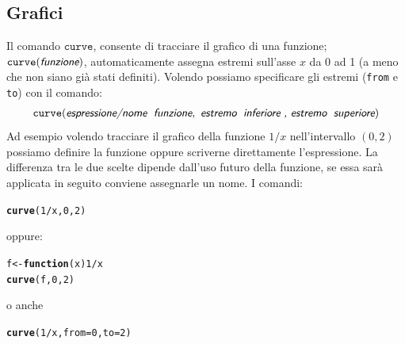 \documentclass[onecolumn,11pt]{book}\usepackage[]{graphicx}\usepackage[]{color}
\makeatletter
\newcommand{\hlnum}[1]{\textcolor[rgb]{0.686,0.059,0.569}{#1}}%
\newcommand{\hlopt}[1]{\textcolor[rgb]{0,0,0}{#1}}%
\newcommand{\hlstd}[1]{\textcolor[rgb]{0.345,0.345,0.345}{#1}}%
\newcommand{\hlkwa}[1]{\textcolor[rgb]{0.161,0.373,0.58}{\textbf{#1}}}%
\newcommand{\hlkwb}[1]{\textcolor[rgb]{0.69,0.353,0.396}{#1}}%
\newcommand{\hlkwc}[1]{\textcolor[rgb]{0.333,0.667,0.333}{#1}}%
\newcommand{\hlkwd}[1]{\textcolor[rgb]{0.737,0.353,0.396}{\textbf{#1}}}%
\newenvironment{kframe}{%
 \def\at@end@of@kframe{}%
 \ifinner\ifhmode%
  \def\at@end@of@kframe{\end{minipage}}%
  \begin{minipage}{\columnwidth}%
 \fi\fi%
 \def\FrameCommand##1{\hskip\@totalleftmargin \hskip-\fboxsep
 \colorbox{shadecolor}{##1}\hskip-\fboxsep
     \hskip-\linewidth \hskip-\@totalleftmargin \hskip\columnwidth}%
 \MakeFramed {\advance\hsize-\width
   \@totalleftmargin\z@ \linewidth\hsize
   \@setminipage}}%
 {\par\unskip\endMakeFramed%
 \at@end@of@kframe}
\newenvironment{knitrout}{}{} %
\newcommand{\varia}[1]{\textsl{\textsf{#1}}}
\makeatother
\begin{document}
\begin{itemize}
\subsection{Grafici}
Il comando $\texttt{curve}$, consente di tracciare il grafico di una funzione; $\texttt{curve}({\varia{funzione}})$, automaticamente assegna estremi sull'asse $x$ da 0 ad 1 (a meno che non siano gi\`a stati definiti). %
Volendo possiamo specificare gli estremi (\texttt{from} e \texttt{to}) con il comando: %
\begin{eqnarray*}\texttt{curve}(\varia{espressione/nome\; funzione}, \varia{ estremo\; inferiore , estremo \;superiore})\end{eqnarray*}
Ad esempio volendo tracciare il grafico della funzione $1/x$ nell'intervallo $(0,2)$ possiamo definire la funzione oppure scriverne direttamente l'espressione. %
La differenza tra le due scelte dipende dall'uso futuro della funzione, se essa sar\`a applicata in seguito conviene assegnarle un nome.
I comandi:
\begin{knitrout}
\color{fgcolor}\begin{kframe}
\begin{alltt}
\hlkwd{curve}\hlstd{(}\hlnum{1}\hlopt{/}\hlstd{x,}\hlnum{0}\hlstd{,}\hlnum{2}\hlstd{)}
\end{alltt}
\end{kframe}
\end{knitrout}
oppure:
\begin{knitrout}
\color{fgcolor}\begin{kframe}
\begin{alltt}
\hlstd{f}\hlkwb{<-}\hlkwa{function}\hlstd{(}\hlkwc{x}\hlstd{)} \hlnum{1}\hlopt{/}\hlstd{x}
\hlkwd{curve}\hlstd{(f,}\hlnum{0}\hlstd{,}\hlnum{2}\hlstd{)}
\end{alltt}
\end{kframe}
\end{knitrout}
o anche
\begin{knitrout}
\color{fgcolor}\begin{kframe}
\begin{alltt}
\hlkwd{curve}\hlstd{(}\hlnum{1}\hlopt{/}\hlstd{x,}\hlkwc{from}\hlstd{=}\hlnum{0}\hlstd{,}\hlkwc{to}\hlstd{=}\hlnum{2}\hlstd{)}
\end{alltt}
\end{kframe}
\end{knitrout}

\end{itemize}
\end{document}
